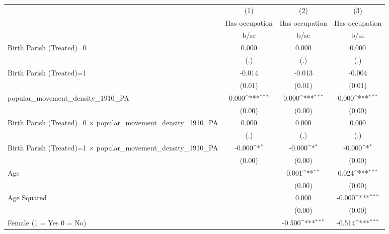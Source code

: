 {
\def\sym#1{\ifmmode^{#1}\else\(^{#1}\)\fi}
\begin{tabular}{l*{3}{c}}
\hline\hline
                    &\multicolumn{1}{c}{(1)}&\multicolumn{1}{c}{(2)}&\multicolumn{1}{c}{(3)}\\
                    &\multicolumn{1}{c}{Has occupation}&\multicolumn{1}{c}{Has occupation}&\multicolumn{1}{c}{Has occupation}\\
                    &        b/se         &        b/se         &        b/se         \\
\hline
Birth Parish (Treated)=0&       0.000         &       0.000         &       0.000         \\
                    &         (.)         &         (.)         &         (.)         \\
Birth Parish (Treated)=1&      -0.014         &      -0.013         &      -0.004         \\
                    &      (0.01)         &      (0.01)         &      (0.01)         \\
popular\_movement\_density\_1910\_PA&       0.000\sym{***}&       0.000\sym{***}&       0.000\sym{***}\\
                    &      (0.00)         &      (0.00)         &      (0.00)         \\
Birth Parish (Treated)=0 $\times$ popular\_movement\_density\_1910\_PA&       0.000         &       0.000         &       0.000         \\
                    &         (.)         &         (.)         &         (.)         \\
Birth Parish (Treated)=1 $\times$ popular\_movement\_density\_1910\_PA&      -0.000\sym{*}  &      -0.000\sym{*}  &      -0.000\sym{*}  \\
                    &      (0.00)         &      (0.00)         &      (0.00)         \\
Age                 &                     &       0.001\sym{**} &       0.024\sym{***}\\
                    &                     &      (0.00)         &      (0.00)         \\
Age Squared         &                     &       0.000         &      -0.000\sym{***}\\
                    &                     &      (0.00)         &      (0.00)         \\
Female (1 = Yes 0 = No)&                     &      -0.500\sym{***}&      -0.514\sym{***}\\

\end{tabular}}
